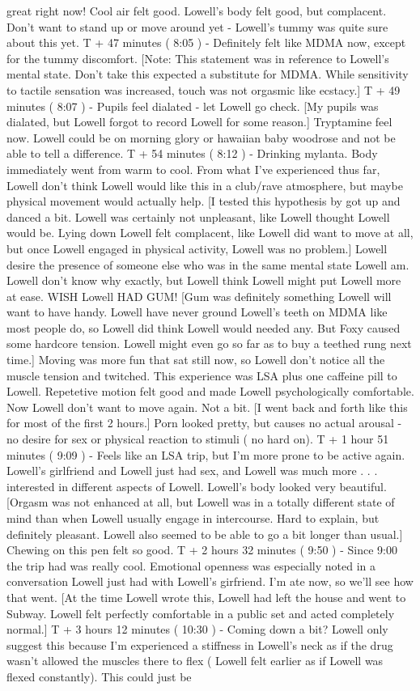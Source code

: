 \documentclass[12pt]{book}
\begin{document}
great right now! Cool air felt good. Lowell's body felt good, but complacent. Don't want to stand up or move around yet - Lowell's tummy was quite sure about this yet. T + 47 minutes ( 8:05 ) - Definitely felt like MDMA now, except for the tummy discomfort. [Note: This statement was in reference to Lowell's mental state. Don't take this expected a substitute for MDMA. While sensitivity to tactile sensation was increased, touch was not orgasmic like ecstacy.] T + 49 minutes ( 8:07 ) - Pupils feel dialated - let Lowell go check. [My pupils was dialated, but Lowell forgot to record Lowell for some reason.] Tryptamine feel now. Lowell could be on morning glory or hawaiian baby woodrose and not be able to tell a difference. T + 54 minutes ( 8:12 ) - Drinking mylanta. Body immediately went from warm to cool. From what I've experienced thus far, Lowell don't think Lowell would like this in a club/rave atmosphere, but maybe physical movement would actually help. [I tested this hypothesis by got up and danced a bit. Lowell was certainly not unpleasant, like Lowell thought Lowell would be. Lying down Lowell felt complacent, like Lowell did want to move at all, but once Lowell engaged in physical activity, Lowell was no problem.] Lowell desire the presence of someone else who was in the same mental state Lowell am. Lowell don't know why exactly, but Lowell think Lowell might put Lowell more at ease. WISH Lowell HAD GUM! [Gum was definitely something Lowell will want to have handy. Lowell have never ground Lowell's teeth on MDMA like most people do, so Lowell did think Lowell would needed any. But Foxy caused some hardcore tension. Lowell might even go so far as to buy a teethed rung next time.] Moving was more fun that sat still now, so Lowell don't notice all the muscle tension and twitched. This experience was LSA plus one caffeine pill to Lowell. Repetetive motion felt good and made Lowell psychologically comfortable. Now Lowell don't want to move again. Not a bit. [I went back and forth like this for most of the first 2 hours.] Porn looked pretty, but causes no actual arousal - no desire for sex or physical reaction to stimuli ( no hard on). T + 1 hour 51 minutes ( 9:09 ) - Feels like an LSA trip, but I'm more prone to be active again. Lowell's girlfriend and Lowell just had sex, and Lowell was much more . . .  interested in different aspects of Lowell. Lowell's body looked very beautiful. [Orgasm was not enhanced at all, but Lowell was in a totally different state of mind than when Lowell usually engage in intercourse. Hard to explain, but definitely pleasant. Lowell also seemed to be able to go a bit longer than usual.] Chewing on this pen felt so good. T + 2 hours 32 minutes ( 9:50 ) - Since 9:00 the trip had was really cool. Emotional openness was especially noted in a conversation Lowell just had with Lowell's girfriend. I'm ate now, so we'll see how that went. [At the time Lowell wrote this, Lowell had left the house and went to Subway. Lowell felt perfectly comfortable in a public set and acted completely normal.] T + 3 hours 12 minutes ( 10:30 ) - Coming down a bit? Lowell only suggest this because I'm experienced a stiffness in Lowell's neck as if the drug wasn't allowed the muscles there to flex ( Lowell felt earlier as if Lowell was flexed constantly). This could just be 
\end{document}
